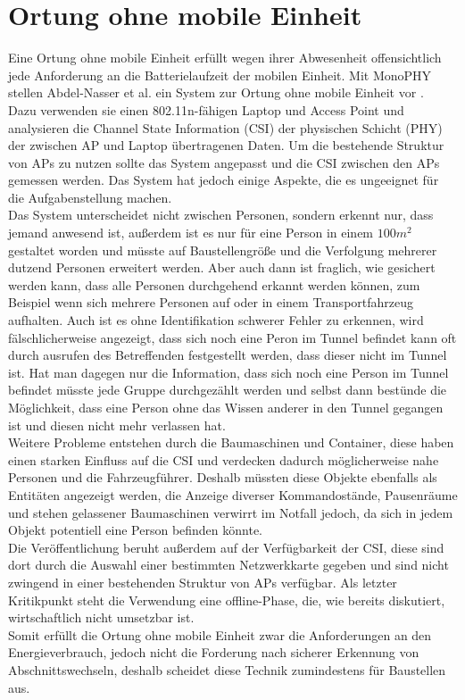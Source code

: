 \section{Ortung ohne mobile Einheit}
Eine Ortung ohne mobile Einheit erfüllt wegen ihrer Abwesenheit offensichtlich jede Anforderung an die Batterielaufzeit der mobilen Einheit.
Mit MonoPHY stellen Abdel-Nasser et al. ein System zur Ortung ohne mobile Einheit vor \cite{abdel2013monophy}. \\
Dazu verwenden sie einen 802.11n-fähigen Laptop und Access Point und analysieren die Channel State Information (CSI) der physischen Schicht (PHY) der zwischen AP und Laptop übertragenen Daten.
Um die bestehende Struktur von APs zu nutzen sollte das System angepasst und die CSI zwischen den APs gemessen werden.
Das System hat jedoch einige Aspekte, die es ungeeignet für die Aufgabenstellung machen.\\
Das System unterscheidet nicht zwischen Personen, sondern erkennt nur, dass jemand anwesend ist, außerdem ist es nur für eine Person in einem $100m^2$ gestaltet worden und müsste auf Baustellengröße und die Verfolgung mehrerer dutzend Personen erweitert werden.
Aber auch dann ist fraglich, wie gesichert werden kann, dass alle Personen durchgehend erkannt werden können, zum Beispiel wenn sich mehrere Personen auf oder in einem Transportfahrzeug aufhalten.
Auch ist es ohne Identifikation schwerer Fehler zu erkennen, wird fälschlicherweise angezeigt, dass sich noch eine Peron im Tunnel befindet kann oft durch ausrufen des Betreffenden festgestellt werden, dass dieser nicht im Tunnel ist. 
Hat man dagegen nur die Information, dass sich noch eine Person im Tunnel befindet müsste jede Gruppe durchgezählt werden und selbst dann bestünde die Möglichkeit, dass eine Person ohne das Wissen anderer in den Tunnel gegangen ist und diesen nicht mehr verlassen hat.\\
Weitere Probleme entstehen durch die Baumaschinen und Container, diese haben einen starken Einfluss auf die CSI und verdecken dadurch möglicherweise nahe Personen und die Fahrzeugführer.
Deshalb müssten diese Objekte ebenfalls als Entitäten angezeigt werden, die Anzeige diverser Kommandostände, Pausenräume und stehen gelassener Baumaschinen verwirrt im Notfall jedoch, da sich in jedem Objekt potentiell eine Person befinden könnte.\\
Die Veröffentlichung beruht außerdem auf der Verfügbarkeit der CSI, diese sind dort durch die Auswahl einer bestimmten Netzwerkkarte gegeben und sind nicht zwingend in einer bestehenden Struktur von APs verfügbar.
Als letzter Kritikpunkt steht die Verwendung eine offline-Phase, die, wie bereits diskutiert, wirtschaftlich nicht umsetzbar ist. \\ 
Somit erfüllt die Ortung ohne mobile Einheit zwar die Anforderungen an den Energieverbrauch, jedoch nicht die Forderung nach sicherer Erkennung von Abschnittswechseln, deshalb scheidet diese Technik zumindestens für Baustellen aus.


